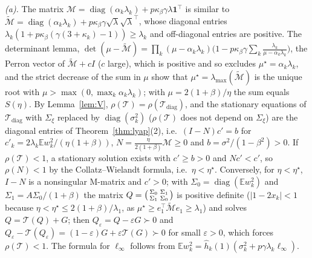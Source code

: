 \documentclass[11pt]{article}
\theoremstyle{remark}
\newcommand{\E}{\mathbb{E}}
\newcommand{\T}{\mathcal T}
\begin{document}
\emph{(a).} The matrix $\mathcal M=\operatorname{diag}(\alpha_k\lambda_k)+p\kappa_\beta\gamma\lambda\mathbf 1^\top$ is similar to $\widetilde{\mathcal M}=\operatorname{diag}(\alpha_k\lambda_k)+p\kappa_\beta\gamma\sqrt\lambda\sqrt\lambda^\top$, whose diagonal entries $\lambda_k(1+p\kappa_\beta(\gamma(3+\kappa_k)-1))\ge\lambda_k$ and off-diagonal entries are positive. The determinant lemma, $\det(\mu-\widetilde{\mathcal M})=\prod_k(\mu-\alpha_k\lambda_k)\big(1-p\kappa_\beta\gamma\sum_k\frac{\lambda_k}{\mu-\alpha_k\lambda_k}\big)$, the Perron vector of $\widetilde{\mathcal M}+cI$ ($c$ large), which is positive and so excludes $\mu^\star=\alpha_k\lambda_k$, and the strict decrease of the sum in $\mu$ show that $\mu^\star=\lambda_{\max}(\widetilde{\mathcal M})$ is the unique root with $\mu>\max(0,\max_k\alpha_k\lambda_k)$; with $\mu=2(1+\beta)/\eta$ the sum equals $S(\eta)$. By Lemma~\ref{lem:V}, $\rho(\T)=\rho(\T_{\mathrm{diag}})$, and the stationary equations of $\T_{\mathrm{diag}}$ with $\Sigma_\xi$ replaced by $\operatorname{diag}(\sigma_k^2)$ ($\rho(\T)$ does not depend on $\Sigma_\xi$) are the diagonal entries of Theorem~\ref{thm:lyap}(2), i.e.\ $(I-N)c'=b$ for $c'_k=2\lambda_k\E w_k^2/(\eta(1+\beta))$, $N=\frac{\eta}{2(1+\beta)}\mathcal M\ge0$ and $b=\sigma^2/(1-\beta^2)>0$. If $\rho(\T)<1$, a stationary solution exists with $c'\ge b>0$ and $Nc'<c'$, so $\rho(N)<1$ by the Collatz--Wielandt formula, i.e.\ $\eta<\eta^\star$. Conversely, for $\eta<\eta^\star$, $I-N$ is a nonsingular M-matrix and $c'>0$; with $\Sigma_0=\operatorname{diag}(\E w_k^2)$ and $\Sigma_1=A\Sigma_0/(1+\beta)$ the matrix $Q=\begin{psmallmatrix}\Sigma_0&\Sigma_1\\\Sigma_1&\Sigma_0\end{psmallmatrix}$ is positive definite ($|1-2x_k|<1$ because $\eta<\eta^\star\le2(1+\beta)/\lambda_1$, as $\mu^\star\ge e_1^\top\widetilde{\mathcal M}e_1\ge\lambda_1$) and solves $Q=\T(Q)+G$; then $Q_\varepsilon=Q-\varepsilon G\succ0$ and $Q_\varepsilon-\T(Q_\varepsilon)=(1-\varepsilon)G+\varepsilon\T(G)\succ0$ for small $\varepsilon>0$, which forces $\rho(\T)<1$. The formula for $\ell_\infty$ follows from $\E w_k^2=\widehat h_k(1)(\sigma_k^2+p\gamma\lambda_k\ell_\infty)$.
\end{document}
